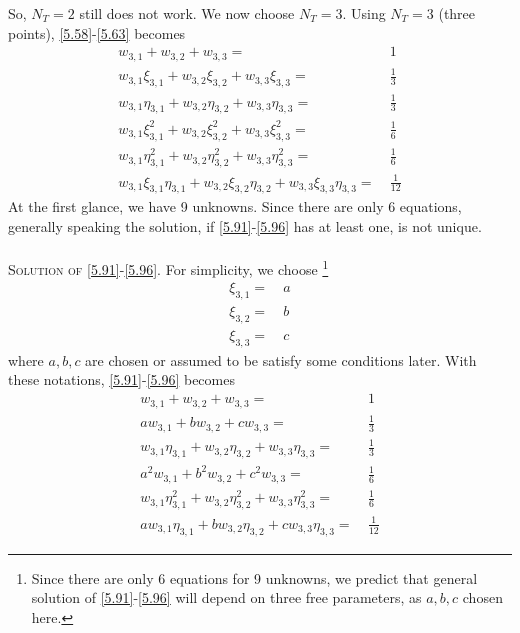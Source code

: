\documentclass[a4paper]{article}
\numberwithin{equation}{section}
\begin{document}
So, $N_T=2$ still does not work. We now choose $N_T=3$. Using $N_T=3$ (three points), \eqref{5.58}-\eqref{5.63} becomes
\begin{align}
\label{5.91}
{w_{3,1}} + {w_{3,2}} + {w_{3,3}} =&\ 1\\
{w_{3,1}}{\xi _{3,1}} + {w_{3,2}}{\xi _{3,2}} + {w_{3,3}}{\xi _{3,3}} =&\ \frac{1}{3}\label{5.92}\\
{w_{3,1}}{\eta _{3,1}} + {w_{3,2}}{\eta _{3,2}} + {w_{3,3}}{\eta _{3,3}} =&\ \frac{1}{3}\label{5.93}\\
{w_{3,1}}\xi _{3,1}^2 + {w_{3,2}}\xi _{3,2}^2 + {w_{3,3}}\xi _{3,3}^2 =&\ \frac{1}{6}\label{5.94}\\
{w_{3,1}}\eta _{3,1}^2 + {w_{3,2}}\eta _{3,2}^2 + {w_{3,3}}\eta _{3,3}^2 =&\ \frac{1}{6}\label{5.95}\\
{w_{3,1}}{\xi _{3,1}}{\eta _{3,1}} + {w_{3,2}}{\xi _{3,2}}{\eta _{3,2}} + {w_{3,3}}{\xi _{3,3}}{\eta _{3,3}} =&\ \frac{1}{{12}} \label{5.96}
\end{align}
At the first glance, we have 9 unknowns. Since there are only 6 equations, generally speaking the solution, if \eqref{5.91}-\eqref{5.96} has at least one, is not unique.\\
\\
\textsc{Solution of \eqref{5.91}-\eqref{5.96}.} For simplicity, we choose \footnote{Since there are only 6 equations for 9 unknowns, we predict that general solution of \eqref{5.91}-\eqref{5.96} will depend on three free parameters, as $a,b,c$ chosen here.}
\begin{align}
\label{5.97}
{\xi _{3,1}} =&\ a\\
{\xi _{3,2}} =&\ b\\
{\xi _{3,3}} =&\ c \label{5.99}
\end{align}
where $a,b,c$ are chosen or assumed to be satisfy some conditions later. With these notations, \eqref{5.91}-\eqref{5.96} becomes
\begin{align}
\label{5.100}
{w_{3,1}} + {w_{3,2}} + {w_{3,3}} =&\ 1\\
a{w_{3,1}} + b{w_{3,2}} + c{w_{3,3}} =&\ \frac{1}{3}\label{5.101}\\
{w_{3,1}}{\eta _{3,1}} + {w_{3,2}}{\eta _{3,2}} + {w_{3,3}}{\eta _{3,3}} =&\ \frac{1}{3}\label{5.102}\\
{a^2}{w_{3,1}} + {b^2}{w_{3,2}} + {c^2}{w_{3,3}} =&\ \frac{1}{6}\label{5.103}\\
{w_{3,1}}\eta _{3,1}^2 + {w_{3,2}}\eta _{3,2}^2 + {w_{3,3}}\eta _{3,3}^2 =&\ \frac{1}{6}\label{5.104}\\
a{w_{3,1}}{\eta _{3,1}} + b{w_{3,2}}{\eta _{3,2}} + c{w_{3,3}}{\eta _{3,3}} =&\ \frac{1}{{12}} \label{5.105}
\end{align}
\end{document}
